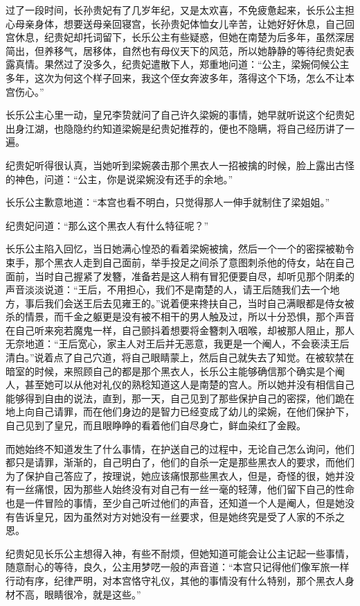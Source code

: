 过了一段时间，长孙贵妃有了几岁年纪，又是太欢喜，不免疲惫起来，长乐公主担心母亲身体，想要送母亲回寝宫，长孙贵妃体恤女儿辛苦，让她好好休息，自己回宫休息，纪贵妃却托词留下，长乐公主有些疑惑，但她在南楚为后多年，虽然深居简出，但养移气，居移体，自然也有母仪天下的风范，所以她静静的等待纪贵妃表露真情。果然过了没多久，纪贵妃遣散下人，郑重地问道：“公主，梁婉伺候公主多年，这次为何这个样子回来，我这个侄女奔波多年，落得这个下场，怎么不让本宫伤心。”

长乐公主心里一动，皇兄李贽就问了自己许久梁婉的事情，她早就听说这个纪贵妃出身江湖，也隐隐约约知道梁婉是纪贵妃推荐的，便也不隐瞒，将自己经历讲了一遍。

纪贵妃听得很认真，当她听到梁婉袭击那个黑衣人一招被擒的时候，脸上露出古怪的神色，问道：“公主，你是说梁婉没有还手的余地。”

长乐公主歉意地道：“本宫也看不明白，只觉得那人一伸手就制住了梁姐姐。”

纪贵妃问道：“那么这个黑衣人有什么特征呢？”

长乐公主陷入回忆，当日她满心惶恐的看着梁婉被擒，然后一个一个的密探被勒令束手，那个黑衣人走到自己面前，举手投足之间杀了意图刺杀他的侍女，站在自己面前，当时自己握紧了发簪，准备若是这人稍有冒犯便要自尽，却听见那个阴柔的声音淡淡说道：“王后，不用担心，我们不是南楚的人，请王后随我们去一个地方，事后我们会送王后去见雍王的。”说着便来搀扶自己，当时自己满眼都是侍女被杀的情景，而千金之躯更是没有被不相干的男人触及过，所以十分恐惧，那个声音在自己听来宛若魔鬼一样，自己颤抖着想要将金簪刺入咽喉，却被那人阻止，那人无奈地道：“王后宽心，家主人对王后并无恶意，我更是一个阉人，不会亵渎王后清白。”说着点了自己穴道，将自己眼睛蒙上，然后自己就失去了知觉。在被软禁在暗室的时候，来照顾自己的都是那个黑衣人，长乐公主能够确信那个确实是个阉人，甚至她可以从他对礼仪的熟稔知道这人是南楚的宫人。所以她并没有相信自己能够得到自由的说法，直到，那一天，自己见到了那些保护自己的密探，他们跪在地上向自己请罪，而在他们身边的是智力已经变成了幼儿的梁婉，在他们保护下，自己见到了皇兄，而且眼睁睁的看着他们自尽身亡，鲜血染红了金殿。

而她始终不知道发生了什么事情，在护送自己的过程中，无论自己怎么询问，他们都只是请罪，渐渐的，自己明白了，他们的自杀一定是那些黑衣人的要求，而他们为了保护自己答应了，按理说，她应该痛恨那些黑衣人，但是，奇怪的很，她并没有一丝痛恨，因为那些人始终没有对自己有一丝一毫的轻薄，他们留下自己的性命也是一件冒险的事情，至少自己听过他们的声音，还知道一个人是阉人，但是她没有告诉皇兄，因为虽然对方对她没有一丝要求，但是她终究是受了人家的不杀之恩。

纪贵妃见长乐公主想得入神，有些不耐烦，但她知道可能会让公主记起一些事情，随意耐心的等待，良久，公主用梦呓一般的声音道：“本宫只记得他们像军旅一样行动有序，纪律严明，对本宫恪守礼仪，其他的事情没有什么特别，那个黑衣人身材不高，眼睛很冷，就是这些。”

